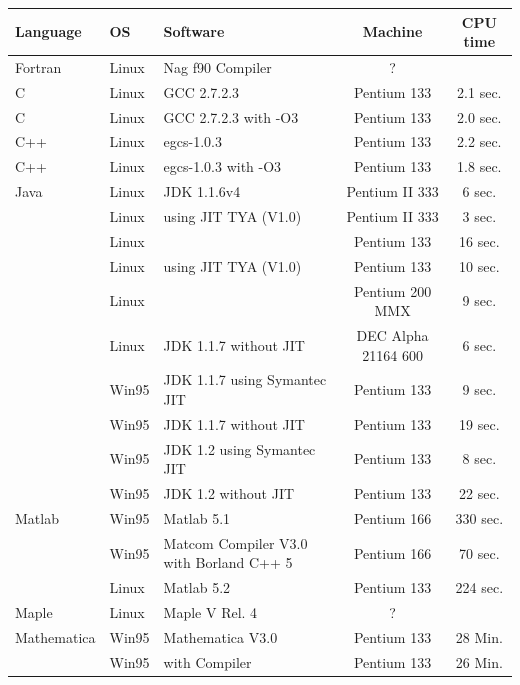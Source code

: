 \begin{table}[htbp]
  \begin{center}
    \leavevmode
    \begin{tabular}{llp{3cm}|c|c}
      Language & OS & Software & Machine & CPU time \\\hline\hline  
   Fortran & Linux & Nag f90 Compiler & ? & \\\hline
   C       & Linux & GCC 2.7.2.3 & Pentium 133 & 2.1 sec. \\\hline
   C       & Linux & GCC 2.7.2.3 with -O3 & Pentium 133 & 2.0 sec. \\\hline
   C++     & Linux & egcs-1.0.3 & Pentium 133 & 2.2 sec. \\\hline
   C++     & Linux & egcs-1.0.3 with -O3 & Pentium 133 & 1.8 sec. \\\hline
      Java & Linux & JDK 1.1.6v4 & Pentium II 333 & 6 sec. \\\hline
           & Linux & using JIT TYA (V1.0) & Pentium II 333 & 3 sec.\\\hline
           & Linux &           & Pentium 133 & 16 sec. \\\hline
           & Linux & using JIT TYA (V1.0) & Pentium 133 & 10 sec.\\\hline
           & Linux &           & Pentium 200 MMX & 9 sec. \\\hline
           & Linux & JDK 1.1.7 without JIT & DEC Alpha 21164 600 & 6 sec. \\\hline
           & Win95 & JDK 1.1.7 using Symantec JIT & Pentium 133 & 9 sec. \\\hline
           & Win95 & JDK 1.1.7 without JIT & Pentium 133 & 19 sec. \\\hline
           & Win95 & JDK 1.2 using Symantec JIT & Pentium 133 & 8 sec. \\\hline
           & Win95 & JDK 1.2 without JIT & Pentium 133 & 22 sec. \\\hline
   Matlab  & Win95 & Matlab 5.1 & Pentium 166 & 330 sec.\\\hline
           & Win95 & Matcom Compiler V3.0 with Borland C++ 5 & Pentium 166 & 70 sec.\\\hline 
           & Linux & Matlab 5.2 & Pentium 133 &  224 sec.\\\hline
   Maple   & Linux & Maple V Rel. 4 & ? & \\\hline
Mathematica& Win95 & Mathematica V3.0 & Pentium 133 & 28 Min. \\\hline
           & Win95 & with Compiler    & Pentium 133 & 26 Min. \\ \hline

\end{tabular}
\end{center}
\end{table}
